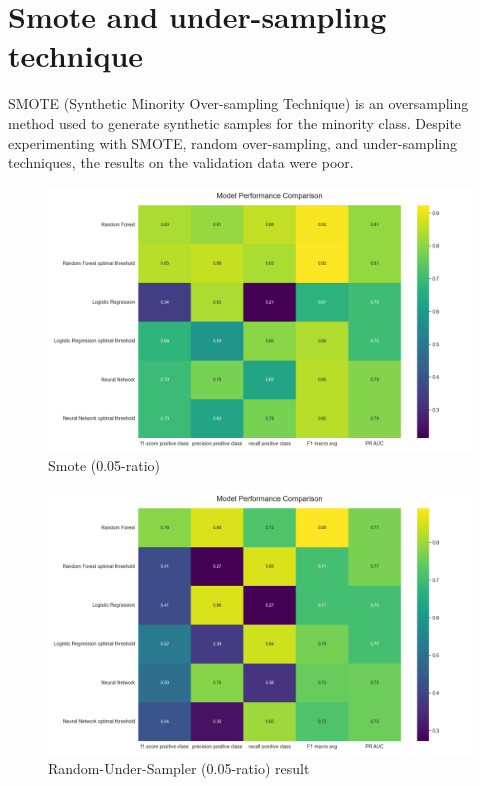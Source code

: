 \section{Smote and under-sampling technique}

SMOTE (Synthetic Minority Over-sampling Technique) is an oversampling method used to generate synthetic samples for the minority class. Despite experimenting with SMOTE, random over-sampling, and under-sampling techniques, the results on the validation data were poor.


\begin{figure}[h]
    \centering
    \includegraphics[width=0.80\linewidth]{Smote (0.05-ratio).png}
    \caption{Smote (0.05-ratio)}
    \label{fig:Smote (0.05-ratio)}
\end{figure}

\begin{figure}[h]
    \centering
    \includegraphics[width=0.80\linewidth]{RandomUnderSampler (0.05-ratio) results.png}
    \caption{Random-Under-Sampler (0.05-ratio) result}
    \label{fig:enter-label}
\end{figure}